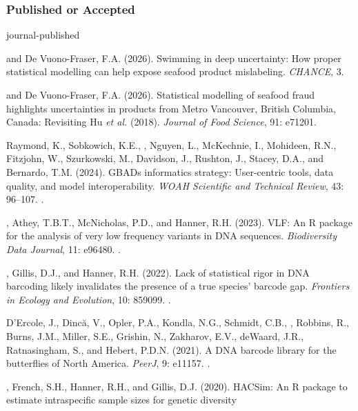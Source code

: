 \subsubsection{Published or Accepted}
\begin{revlist}[itemsep=0.45\baselineskip]{journal-published}
\item \me and \dsup De Vuono-Fraser, F.A. (2026). Swimming in deep uncertainty:
  How proper statistical modelling can help expose seafood product mislabeling.
  \textit{CHANCE}, 3. 
\item \me and \dsup De Vuono-Fraser, F.A. (2026). Statistical modelling of
  seafood fraud highlights uncertainties in products from Metro Vancouver,
  British Columbia, Canada: Revisiting Hu \textit{et al.} (2018).
  \textit{Journal of Food Science}, 91: e71201.
\item Raymond, K., Sobkowich, K.E., \me, Nguyen, L., McKechnie, I., Mohideen, R.N.,
  Fitzjohn, W., Szurkowski, M., Davidson, J., Rushton, J., Stacey, D.A., and
  Bernardo, T.M. (2024). GBADs informatics strategy: User-centric tools, data
  quality, and model interoperability. \textit{WOAH Scientific and Technical
  Review}, 43: 96--107.
  .
\item \me, Athey, T.B.T., McNicholas, P.D., and Hanner, R.H. (2023). VLF: An R
  package for the analysis of very low frequency variants in DNA sequences.
  \textit{Biodiversity Data Journal}, 11: e96480.
  .
\item \me, Gillis, D.J., and Hanner, R.H. (2022). Lack of statistical rigor in
  DNA barcoding likely invalidates the presence of a true species' barcode gap.
  \textit{Frontiers in Ecology and Evolution}, 10: 859099. .
\item D'Ercole, J., Dincă, V., Opler, P.A., Kondla, N.G., Schmidt, C.B., \me,
  Robbins, R., Burns, J.M., Miller, S.E., Grishin, N., Zakharov, E.V.,
  deWaard, J.R., Ratnasingham, S., and Hebert, P.D.N. (2021). A DNA barcode
  library for the butterflies of North America. \textit{PeerJ}, 9: e11157.
  .
\item \me, \dsup French, S.H., Hanner, R.H., and Gillis, D.J. (2020). HACSim: An
  R package to estimate intraspecific sample sizes for genetic diversity

\end{revlist}
